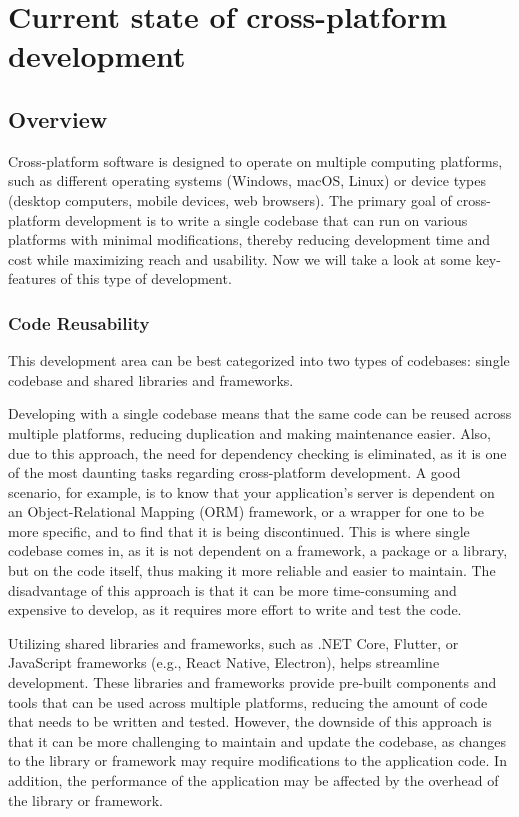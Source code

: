 \chapter{Current state of cross-platform development}

\section{Overview}

Cross-platform software is designed to operate on multiple computing platforms, such as different operating systems (Windows, macOS, Linux) or device types (desktop computers, mobile devices, web browsers).
The primary goal of cross-platform development is to write a single codebase that can run on various platforms with minimal modifications, thereby reducing development time and cost while maximizing reach and usability.
Now we will take a look at some key-features of this type of development.

\subsection{Code Reusability}
This development area can be best categorized into two types of codebases: single codebase and shared libraries and frameworks.

\par
Developing with a single codebase means that the same code can be reused across multiple platforms, reducing duplication and making maintenance easier.
Also, due to this approach, the need for dependency checking is eliminated, as it is one of the most daunting tasks regarding cross-platform development.
A good scenario, for example, is to know that your application's server is dependent on an Object-Relational Mapping (ORM) framework, or a wrapper for one to be more specific, and to find that it is being discontinued.
This is where single codebase comes in, as it is not dependent on a framework, a package or a library, but on the code itself, thus making it more reliable and easier to maintain. 
The disadvantage of this approach is that it can be more time-consuming and expensive to develop, as it requires more effort to write and test the code.

\par
Utilizing shared libraries and frameworks, such as .NET Core, Flutter, or JavaScript frameworks (e.g., React Native, Electron), helps streamline development.
These libraries and frameworks provide pre-built components and tools that can be used across multiple platforms, reducing the amount of code that needs to be written and tested.
However, the downside of this approach is that it can be more challenging to maintain and update the codebase, as changes to the library or framework may require modifications to the application code.
In addition, the performance of the application may be affected by the overhead of the library or framework.

